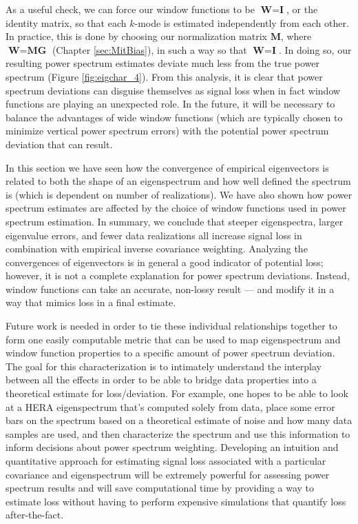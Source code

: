 As a useful check, we can force our window functions to be $\textbf{W} = \textbf{I}$, or the identity matrix, so that each $k$-mode is estimated independently from each other. In practice, this is done by choosing our normalization matrix $\textbf{M}$, where $\textbf{W} = \textbf{M}\textbf{G}$ (Chapter \ref{sec:MitBias}), in such a way so that $\textbf{W} = \textbf{I}$. In doing so, our resulting power spectrum estimates deviate much less from the true power spectrum (Figure \ref{fig:eigchar_4}). From this analysis, it is clear that power spectrum deviations can disguise themselves as signal loss when in fact window functions are playing an unexpected role. In the future, it will be necessary to balance the advantages of wide window functions (which are typically chosen to minimize vertical power spectrum errors) with the potential power spectrum deviation that can result.

In this section we have seen how the convergence of empirical eigenvectors is related to both the shape of an eigenspectrum and how well defined the spectrum is (which is dependent on number of realizations). We have also shown how power spectrum estimates are affected by the choice of window functions used in power spectrum estimation. In summary, we conclude that steeper eigenspectra, larger eigenvalue errors, and fewer data realizations all increase signal loss in combination with empirical inverse covariance weighting. Analyzing the convergences of eigenvectors is in general a good indicator of potential loss; however, it is not a complete explanation for power spectrum deviations. Instead, window functions can take an accurate, non-lossy result --- and modify it in a way that mimics loss in a final estimate. 

Future work is needed in order to tie these individual relationships together to form one easily computable metric that can be used to map eigenspectrum and window function properties to a specific amount of power spectrum deviation. The goal for this characterization is to intimately understand the interplay between all the effects in order to be able to bridge data properties into a theoretical estimate for loss/deviation. For example, one hopes to be able to look at a HERA eigenspectrum that's computed solely from data, place some error bars on the spectrum based on a theoretical estimate of noise and how many data samples are used, and then characterize the spectrum and use this information to inform decisions about power spectrum weighting. Developing an intuition and quantitative approach for estimating signal loss associated with a particular covariance and eigenspectrum will be extremely powerful for assessing power spectrum results and will save computational time by providing a way to estimate loss without having to perform expensive simulations that quantify loss after-the-fact. 

